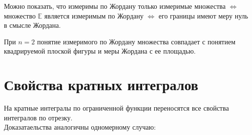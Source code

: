 \begin{remark}
  Можно показать, что измеримы по Жордану только измеримые множества
  $\Longleftrightarrow$ множество $\mathbb{E}$ является измеримым по Жордану
  $\Longleftrightarrow$ его границы имеют меру нуль в смысле Жордана.
\end{remark}

\begin{remark}
  При $n = 2$ понятие измеримого по Жордану множества совпадает с понятием
  квадрируемой плоской фигуры и меры Жордана с ее площадью.
\end{remark}

\section{Свойства кратных интегралов}
На кратные интегралы по ограниченной функции переносятся все свойства
интегралов по отрезку. \\
Доказатаельства аналогичны одномерному случаю:
